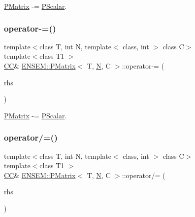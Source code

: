 \mbox{\hyperlink{classENSEM_1_1PMatrix}{P\+Matrix}} -\/= \mbox{\hyperlink{classENSEM_1_1PScalar}{P\+Scalar}}. 

\mbox{\label{classENSEM_1_1PMatrix_ad33381d53cc105f6f64869316aa0e2c2}} 
\subsubsection{\texorpdfstring{operator-\/=()}{operator-=()}\hspace{0.1cm}{\footnotesize\ttfamily [6/6]}}
{\footnotesize\ttfamily template$<$class T, int N, template$<$ class, int $>$ class C$>$ \\
template$<$class T1 $>$ \\
\mbox{\hyperlink{classENSEM_1_1PMatrix_a744bac549029029effe32dc1705660ec}{CC}}\& \mbox{\hyperlink{classENSEM_1_1PMatrix}{E\+N\+S\+E\+M\+::\+P\+Matrix}}$<$ T, \mbox{\hyperlink{adat__devel_2lib_2hadron_2operator__name__util_8cc_a7722c8ecbb62d99aee7ce68b1752f337}{N}}, C $>$\+::operator-\/= (\begin{DoxyParamCaption}\item[{const \mbox{\hyperlink{classENSEM_1_1PScalar}{P\+Scalar}}$<$ T1 $>$ \&}]{rhs }\end{DoxyParamCaption})\hspace{0.3cm}{\ttfamily [inline]}}



\mbox{\hyperlink{classENSEM_1_1PMatrix}{P\+Matrix}} -\/= \mbox{\hyperlink{classENSEM_1_1PScalar}{P\+Scalar}}. 

\mbox{\label{classENSEM_1_1PMatrix_ade8246cb542a62e3368d33026885ca59}} 
\subsubsection{\texorpdfstring{operator/=()}{operator/=()}\hspace{0.1cm}{\footnotesize\ttfamily [1/3]}}
{\footnotesize\ttfamily template$<$class T, int N, template$<$ class, int $>$ class C$>$ \\
template$<$class T1 $>$ \\
\mbox{\hyperlink{classENSEM_1_1PMatrix_a744bac549029029effe32dc1705660ec}{CC}}\& \mbox{\hyperlink{classENSEM_1_1PMatrix}{E\+N\+S\+E\+M\+::\+P\+Matrix}}$<$ T, \mbox{\hyperlink{adat__devel_2lib_2hadron_2operator__name__util_8cc_a7722c8ecbb62d99aee7ce68b1752f337}{N}}, C $>$\+::operator/= (\begin{DoxyParamCaption}\item[{const \mbox{\hyperlink{classENSEM_1_1PScalar}{P\+Scalar}}$<$ T1 $>$ \&}]{rhs }\end{DoxyParamCaption})\hspace{0.3cm}{\ttfamily [inline]}}



